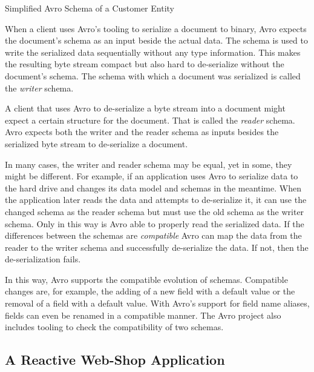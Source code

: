 \begin{listing}[H]
  \inputminted{json}{assets/src/Customer.avsc}
  \caption{Simplified Avro Schema of a Customer Entity}\label{lst:avro-schema-person}
\end{listing}

When a client uses Avro's tooling to serialize a document to binary, Avro expects the document's schema as an input beside the actual data.
The schema is used to write the serialized data sequentially without any type information. 
This makes the resulting byte stream compact but also hard to de-serialize without the document's schema.
The schema with which a document was serialized is called the \emph{writer} schema.
\parencite{avro}

A client that uses Avro to de-serialize a byte stream into a document might expect a certain structure for the document.
That is called the \emph{reader} schema.
Avro expects both the writer and the reader schema as inputs besides the serialized byte stream to de-serialize a document.
\parencite{avro}

In many cases, the writer and reader schema may be equal, yet in some, they might be different.
For example, if an application uses Avro to serialize data to the hard drive and changes its data model and schemas in the meantime.
When the application later reads the data and attempts to de-serialize it, it can use the changed schema as the reader schema but must use the old schema as the writer schema.
Only in this way is Avro able to properly read the serialized data.
If the differences between the schemas are \emph{compatible} Avro can map the data from the reader to the writer schema and successfully de-serialize the data.
If not, then the de-serialization fails.
\parencite{avro}

In this way, Avro supports the compatible evolution of schemas.
Compatible changes are, for example, the adding of a new field with a default value or the removal of a field with a default value.
With Avro's support for field name aliases, fields can even be renamed in a compatible manner.
The Avro project also includes tooling to check the compatibility of two schemas.
\parencite{avro}


\subsection{A Reactive Web-Shop Application}\label{sec:web-shop}

